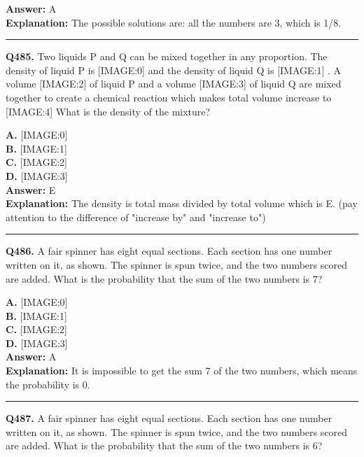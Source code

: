 \documentclass[12pt]{article}
\begin{document}
\textbf{Answer:} A \\
\textbf{Explanation:} The possible solutions are: all the numbers are 3, which is 1/8.

\hrule
\vspace{1em}


\noindent
\textbf{Q485.} Two liquids P and Q can be mixed together in any proportion. The density of liquid P is
[IMAGE:0]
and the density of liquid Q is
[IMAGE:1]
. A volume
[IMAGE:2]
of liquid P and a volume
[IMAGE:3]
of liquid Q are mixed together to create a chemical reaction which makes total volume increase to
[IMAGE:4]
What is the density of the mixture?



\textbf{A.} [IMAGE:0] \\
\textbf{B.} [IMAGE:1] \\
\textbf{C.} [IMAGE:2] \\
\textbf{D.} [IMAGE:3] \\

\textbf{Answer:} E \\
\textbf{Explanation:} The density is total mass divided by total volume which is E. (pay attention to the difference of "increase by" and "increase to")

\hrule
\vspace{1em}


\noindent
\textbf{Q486.} A fair spinner has eight equal sections. Each section has one number written on it, as shown.
The spinner is spun twice, and the two numbers scored are added. What is the probability that the sum of the two numbers is 7?



\textbf{A.} [IMAGE:0] \\
\textbf{B.} [IMAGE:1] \\
\textbf{C.} [IMAGE:2] \\
\textbf{D.} [IMAGE:3] \\

\textbf{Answer:} A \\
\textbf{Explanation:} It is impossible to get the sum 7 of the two numbers, which means the probability is 0.

\hrule
\vspace{1em}


\noindent
\textbf{Q487.} A fair spinner has eight equal sections. Each section has one number written on it, as shown.
The spinner is spun twice, and the two numbers scored are added. What is the probability that the sum of the two numbers is 6?
\end{document}
